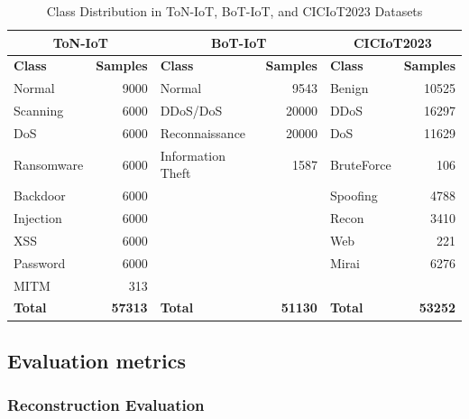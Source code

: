 \documentclass[journal,twoside,web]{ieeecolor}
\begin{document}
\begin{table}[!t]
\centering
\caption{Class Distribution in ToN-IoT, BoT-IoT, and CICIoT2023 Datasets}
\label{tab:datasets_distribution}

\scriptsize
\renewcommand{\arraystretch}{1.05}
\setlength{\tabcolsep}{3pt}

\begin{tabular}{|l|r||l|r||l|r|}
\hline
\multicolumn{2}{|c||}{\textbf{ToN-IoT}} &
\multicolumn{2}{c||}{\textbf{BoT-IoT}} &
\multicolumn{2}{c|}{\textbf{CICIoT2023}} \\
\hline

\textbf{Class} & \textbf{Samples} &
\textbf{Class} & \textbf{Samples} &
\textbf{Class} & \textbf{Samples} \\
\hline

Normal        & 9000 & Normal              & 9543  & Benign     & 10525 \\
Scanning      & 6000 & DDoS/DoS            & 20000 & DDoS       & 16297 \\
DoS           & 6000 & Reconnaissance      & 20000 & DoS        & 11629 \\
Ransomware    & 6000 & Information Theft   & 1587  & BruteForce & 106 \\
Backdoor      & 6000 &                     &       & Spoofing   & 4788 \\
Injection     & 6000 &                     &       & Recon      & 3410 \\
XSS           & 6000 &                     &       & Web        & 221 \\
Password      & 6000 &                     &       & Mirai      & 6276 \\
MITM          & 313  &                     &       &            &      \\
\hline

\textbf{Total} & \textbf{57313} &
\textbf{Total} & \textbf{51130} &
\textbf{Total} & \textbf{53252} \\
\hline

\end{tabular}
\end{table}

\subsection{Evaluation metrics}

\subsubsection{Reconstruction Evaluation}
\end{document}
